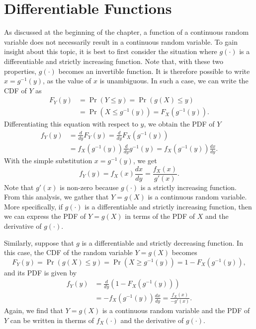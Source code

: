 \section{Differentiable Functions}

As discussed at the beginning of the chapter, a function of a continuous random variable does not necessarily result in a continuous random variable.
To gain insight about this topic, it is best to first consider the situation where $g(\cdot)$ is a differentiable and strictly increasing function.
Note that, with these two properties, $g(\cdot)$ becomes an invertible function.
It is therefore possible to write $x = g^{-1} (y)$, as the value of $x$ is unambiguous.
In such a case, we can write the CDF of $Y$ as
\begin{equation*}
\begin{split}
F_Y(y) &= \Pr (Y \leq y) = \Pr (g(X) \leq y) \\
&= \Pr \left( X \leq g^{-1}(y) \right)
= F_X \left( g^{-1} (y) \right) .
\end{split}
\end{equation*}
Differentiating this equation with respect to $y$, we obtain the PDF of $Y$
\begin{equation*}
\begin{split}
f_Y (y) &= \frac{d}{dy} F_Y(y)
= \frac{d}{dy} F_X \left( g^{-1} (y) \right) \\
&= f_X \left( g^{-1} (y) \right) \frac{d}{dy} g^{-1} (y)
= f_X \left( g^{-1} (y) \right) \frac{dx}{dy} .
\end{split}
\end{equation*}
With the simple substitution $x = g^{-1} (y)$, we get
\begin{equation*}
f_Y (y) = f_X (x) \frac{dx}{dy}
= \frac{f_X (x)}{g'(x)} .
\end{equation*}
Note that $g'(x)$ is non-zero because $g(\cdot)$ is a strictly increasing function.
From this analysis, we gather that $Y=g(X)$ is a continuous random variable.
More specifically, if $g(\cdot)$ is a differentiable and strictly increasing function, then we can express the PDF of $Y = g(X)$ in terms of the PDF of $X$ and the derivative of $g(\cdot)$.

Similarly, suppose that $g$ is a differentiable and strictly decreasing function.
In this case, the CDF of the random variable $Y = g(X)$ becomes
\begin{equation*}
F_Y(y) = \Pr (g(X) \leq y)
= \Pr \left( X \geq g^{-1}(y) \right)
= 1 - F_X \left( g^{-1} (y) \right) ,
\end{equation*}
and its PDF is given by
\begin{equation*}
\begin{split}
f_Y (y) &= \frac{d}{dy} \left( 1 - F_X \left( g^{-1} (y) \right) \right) \\
&= - f_X \left( g^{-1} (y) \right) \frac{dx}{dy}
= \frac{f_X (x)}{- g'(x)} .
\end{split}
\end{equation*}
Again, we find that $Y = g(X)$ is a continuous random variable and the PDF of $Y$ can be written in therms of $f_X( \cdot)$ and the derivative of $g(\cdot)$.

